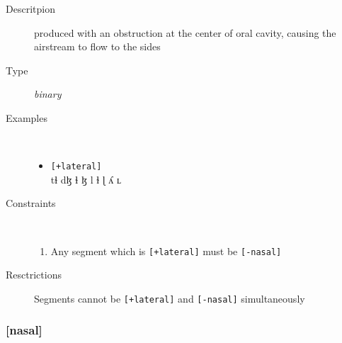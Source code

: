 \documentclass[10pt,letterpaper]{article}
\begin{document}
\begin{description}
\item[Descritpion] produced with an obstruction at the center of oral cavity, causing the airstream to flow to the sides
\item[Type] \emph{binary}
\item[Examples]\
  \begin{itemize}
    \item \texttt{[+lateral]}\\
    tɬ dɮ ɬ ɮ l ɫ ɭ ʎ ʟ
  \end{itemize}
\item[Constraints]\
  \begin{enumerate}
    \item Any segment which is \texttt{[+lateral]} must be \texttt{[-nasal]}
  \end{enumerate}
\item[Resctrictions] Segments cannot be \texttt{[+lateral]} and \texttt{[-nasal]} simultaneously
\end{description}

\subsubsection{[nasal]}
\label{ssub:feature_nasal}

\end{document}
